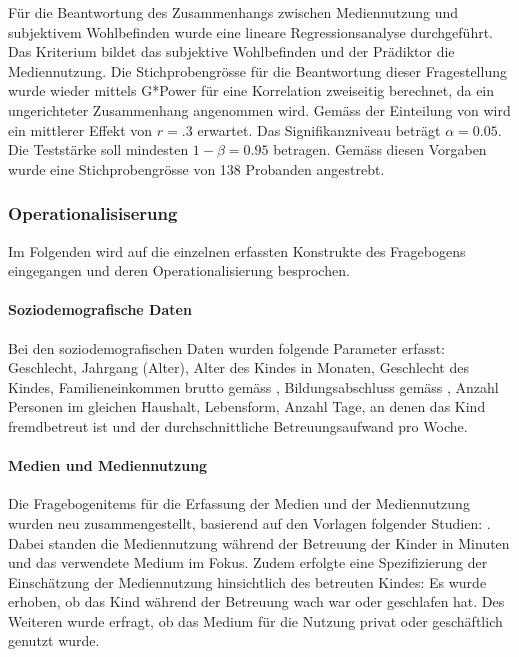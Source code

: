 Für die Beantwortung des Zusammenhangs zwischen Mediennutzung und subjektivem Wohlbefinden wurde eine lineare Regressionsanalyse durchgeführt. Das Kriterium bildet das subjektive Wohlbefinden und der Prädiktor die Mediennutzung. Die Stichprobengrösse für die Beantwortung dieser Fragestellung wurde wieder mittels G*Power für eine Korrelation zweiseitig berechnet, da ein ungerichteter Zusammenhang angenommen wird. Gemäss der Einteilung von  wird ein mittlerer Effekt von $r=.3$ erwartet. Das Signifikanzniveau beträgt $\alpha=0.05$. Die Teststärke soll mindesten $1-\beta=0.95$ betragen. Gemäss diesen Vorgaben wurde eine Stichprobengrösse von 138 Probanden angestrebt.


\subsubsection{Operationalisiserung} \label{sec:Operationalisierung}
Im Folgenden wird auf die einzelnen erfassten Konstrukte des Fragebogens eingegangen und deren Operationalisierung besprochen.

\paragraph{Soziodemografische Daten}\label{sec:SoziodemografischeDaten}
Bei den soziodemografischen Daten wurden folgende Parameter erfasst: Geschlecht, Jahrgang (Alter), Alter des Kindes in Monaten, Geschlecht des Kindes, Familieneinkommen brutto gemäss , Bildungsabschluss gemäss , Anzahl Personen im gleichen Haushalt, Lebensform, Anzahl Tage, an denen das Kind fremdbetreut ist und der durchschnittliche Betreuungsaufwand pro Woche.

\paragraph{Medien und Mediennutzung}\label{sec:MedienMediennutzung}
Die Fragebogenitems für die Erfassung der Medien und der Mediennutzung wurden neu zusammengestellt, basierend auf den Vorlagen folgender Studien: . Dabei standen die Mediennutzung während der Betreuung der Kinder in Minuten und das verwendete Medium im Fokus. Zudem erfolgte eine Spezifizierung der Einschätzung der Mediennutzung hinsichtlich des betreuten Kindes: Es wurde erhoben, ob das Kind während der Betreuung wach war oder geschlafen hat. Des Weiteren wurde erfragt, ob das Medium für die Nutzung privat oder geschäftlich genutzt wurde. 

